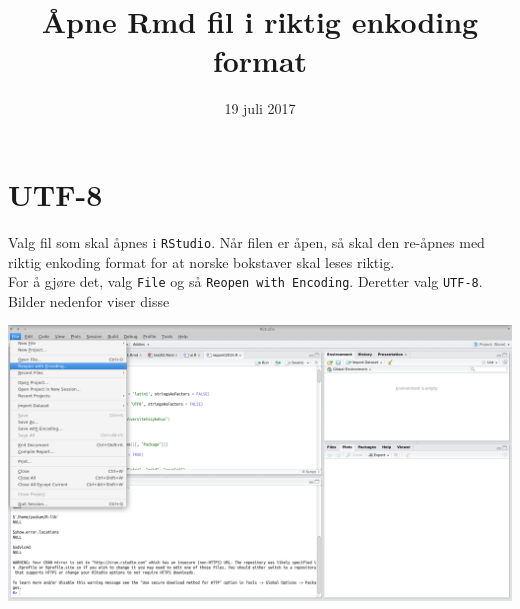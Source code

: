 \documentclass[11pt]{article}
\date{19 juli 2017}
\title{Åpne Rmd fil i riktig enkoding format}
\begin{document}
\maketitle
\section*{UTF-8}
\label{sec:orgaa8b581}
Valg fil som skal åpnes i \texttt{RStudio}. Når filen er åpen, så skal den re-åpnes med riktig
enkoding format for at norske bokstaver skal leses riktig.  \\

For å gjøre det, valg \texttt{File} og så \texttt{Reopen with Encoding}. Deretter valg \texttt{UTF-8}. Bilder nedenfor viser disse

\begin{center}
\includegraphics[width=15cm]{./utf8v2.png}
\end{center}
\end{document}
